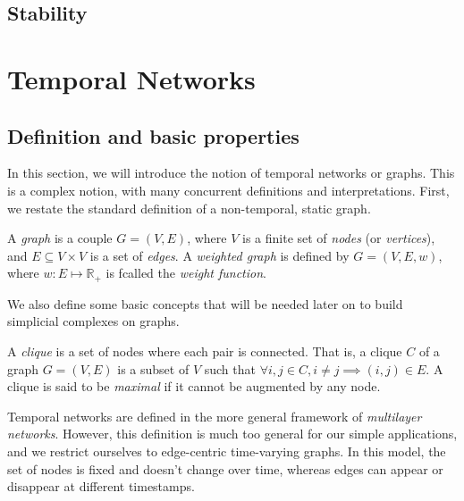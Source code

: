 \documentclass[a4paper,11pt,openany,extrafontsizes]{memoir}
\begin{document}
\section{Stability}%
\label{sec:stability}



\chapter{Temporal Networks}%
\label{cha:temporal-networks}

\section{Definition and basic properties}%
\label{sec:defin-basic-prop}

In this section, we will introduce the notion of temporal networks or
graphs. This is a complex notion, with many concurrent definitions and
interpretations. First, we restate the standard definition of a
non-temporal, static graph.

\begin{defn}[Graph]
  A \emph{graph} is a couple $G = (V, E)$, where $V$ is a finite set
  of \emph{nodes} (or \emph{vertices}), and $E \subseteq V\times V$ is
  a set of \emph{edges}. A \emph{weighted graph} is defined by
  $G = (V, E, w)$, where $w : E\mapsto \mathbb{R}_+$ is fcalled the
  \emph{weight function}.
\end{defn}

We also define some basic concepts that will be needed later on to
build simplicial complexes on graphs.

\begin{defn}[Clique]
  A \emph{clique} is a set of nodes where each pair is connected. That
  is, a clique $C$ of a graph $G = (V,E)$ is a subset of $V$ such that
  $\forall i,j\in C, i \neq j \implies (i,j)\in E$. A clique is said
  to be \emph{maximal} if it cannot be augmented by any node.
\end{defn}

Temporal networks are defined in the more general framework of
\emph{multilayer networks}. However, this definition is much too
general for our simple applications, and we restrict ourselves to
edge-centric time-varying graphs. In this model, the set of nodes is
fixed and doesn't change over time, whereas edges can appear or
disappear at different timestamps.
\end{document}
